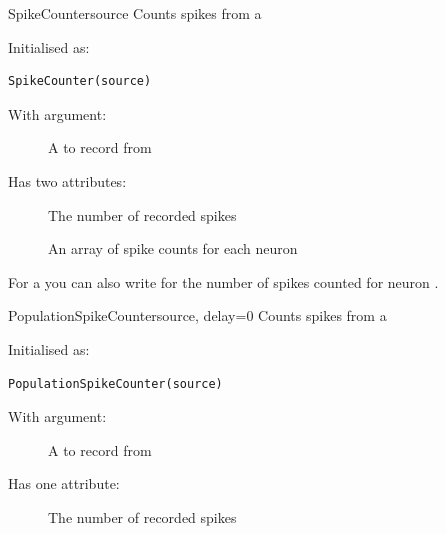 \documentclass[letterpaper,10pt]{manual}
\begin{document}
\hypertarget{brian.SpikeCounter}{}\begin{classdesc}{SpikeCounter}{source}
Counts spikes from a \hyperlink{brian.NeuronGroup}{}

Initialised as:

\begin{Verbatim}[commandchars=@\[\]]
SpikeCounter(source)
\end{Verbatim}

With argument:
\begin{description}
\item[]
A \hyperlink{brian.NeuronGroup}{} to record from

\end{description}

Has two attributes:
\begin{description}
\item[]
The number of recorded spikes

\item[]
An array of spike counts for each neuron

\end{description}

For a \hyperlink{brian.SpikeCounter}{}  you can also write  for the
number of spikes counted for neuron .
\end{classdesc}


\hypertarget{brian.PopulationSpikeCounter}{}\begin{classdesc}{PopulationSpikeCounter}{source, delay=0}
Counts spikes from a \hyperlink{brian.NeuronGroup}{}

Initialised as:

\begin{Verbatim}[commandchars=@\[\]]
PopulationSpikeCounter(source)
\end{Verbatim}

With argument:
\begin{description}
\item[]
A \hyperlink{brian.NeuronGroup}{} to record from

\end{description}

Has one attribute:
\begin{description}
\item[]
The number of recorded spikes

\end{description}
\end{classdesc}
\end{document}
